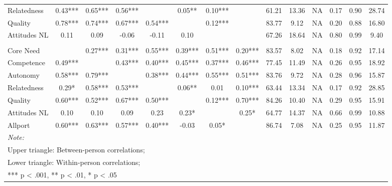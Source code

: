 \begin{table}
\begin{minipage}[t][\textheight][t]{\textwidth}
{\begin{tabular}[t]{lccccccccccccc}
\hspace{1em}Relatedness & 0.43*** & 0.65*** & 0.56*** &  & 0.05** & 0.10*** &  & 61.21 & 13.36 & NA & 0.17 & 0.90 & 28.74\\
\hspace{1em}Quality & 0.78*** & 0.74*** & 0.67*** & 0.54*** &  & 0.12*** &  & 83.77 & 9.12 & NA & 0.20 & 0.88 & 16.80\\
\hspace{1em}Attitudes NL & 0.11 & 0.09 & -0.06 & -0.11 & 0.10 &  &  & 67.26 & 18.64 & NA & 0.80 & 0.99 & 9.40\\
\addlinespace[0.3em]
\multicolumn{14}{l}{\textbf{Study 3}}\\
\hspace{1em}Core Need &  & 0.27*** & 0.31*** & 0.55*** & 0.39*** & 0.51*** & 0.20*** & 83.57 & 8.02 & NA & 0.18 & 0.92 & 17.14\\
\hspace{1em}Competence & 0.49*** &  & 0.43*** & 0.40*** & 0.45*** & 0.37*** & 0.46*** & 77.45 & 11.49 & NA & 0.26 & 0.95 & 18.92\\
\hspace{1em}Autonomy & 0.58*** & 0.79*** &  & 0.38*** & 0.44*** & 0.55*** & 0.51*** & 83.76 & 9.72 & NA & 0.28 & 0.96 & 15.87\\
\hspace{1em}Relatedness & 0.29* & 0.58*** & 0.53*** &  & 0.06** & 0.01 & 0.10*** & 63.44 & 13.34 & NA & 0.17 & 0.92 & 28.85\\
\hspace{1em}Quality & 0.60*** & 0.52*** & 0.67*** & 0.50*** &  & 0.12*** & 0.70*** & 84.26 & 10.40 & NA & 0.29 & 0.95 & 15.91\\
\hspace{1em}Attitudes NL & 0.10 & 0.10 & 0.09 & 0.23 & 0.23* &  & 0.25* & 64.77 & 14.37 & NA & 0.66 & 0.99 & 10.88\\
\hspace{1em}Allport & 0.60*** & 0.63*** & 0.57*** & 0.40*** & -0.03 & 0.05* &  & 86.74 & 7.08 & NA & 0.25 & 0.95 & 11.87\\
\bottomrule
\multicolumn{14}{l}{\rule{0pt}{1em}\textit{Note: }}\\
\multicolumn{14}{l}{\rule{0pt}{1em}Upper triangle: Between-person correlations;}\\
\multicolumn{14}{l}{\rule{0pt}{1em}Lower triangle: Within-person correlations;}\\
\multicolumn{14}{l}{\rule{0pt}{1em}*** p < .001, ** p < .01,  * p < .05}\\
\end{tabular}}
\end{minipage}
\end{table}
